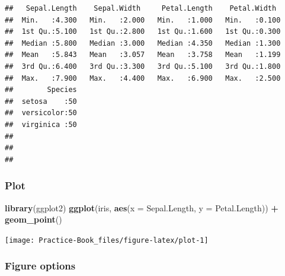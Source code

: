 \documentclass[
]{book}
\newenvironment{Shaded}{\begin{snugshade}}{\end{snugshade}}
\newcommand{\DataTypeTok}[1]{\textcolor[rgb]{0.13,0.29,0.53}{#1}}
\newcommand{\KeywordTok}[1]{\textcolor[rgb]{0.13,0.29,0.53}{\textbf{#1}}}
\newcommand{\NormalTok}[1]{#1}
\newcommand{\OperatorTok}[1]{\textcolor[rgb]{0.81,0.36,0.00}{\textbf{#1}}}
\newcommand{\StringTok}[1]{\textcolor[rgb]{0.31,0.60,0.02}{#1}}
\begin{document}
\begin{verbatim}
##   Sepal.Length    Sepal.Width     Petal.Length    Petal.Width   
##  Min.   :4.300   Min.   :2.000   Min.   :1.000   Min.   :0.100  
##  1st Qu.:5.100   1st Qu.:2.800   1st Qu.:1.600   1st Qu.:0.300  
##  Median :5.800   Median :3.000   Median :4.350   Median :1.300  
##  Mean   :5.843   Mean   :3.057   Mean   :3.758   Mean   :1.199  
##  3rd Qu.:6.400   3rd Qu.:3.300   3rd Qu.:5.100   3rd Qu.:1.800  
##  Max.   :7.900   Max.   :4.400   Max.   :6.900   Max.   :2.500  
##        Species  
##  setosa    :50  
##  versicolor:50  
##  virginica :50  
##                 
##                 
## 
\end{verbatim}

\hypertarget{plot}{%
\subsubsection{Plot}\label{plot}}

\begin{Shaded}
\begin{Highlighting}[]
\KeywordTok{library}\NormalTok{(ggplot2)}
\KeywordTok{ggplot}\NormalTok{(iris, }\KeywordTok{aes}\NormalTok{(}\DataTypeTok{x =}\NormalTok{ Sepal.Length, }\DataTypeTok{y =}\NormalTok{ Petal.Length)) }\OperatorTok{+}\StringTok{ }\KeywordTok{geom\_point}\NormalTok{()}
\end{Highlighting}
\end{Shaded}

\begin{center}\texttt{[image: Practice-Book\_files/figure-latex/plot-1]} \end{center}

\hypertarget{figure-options}{%
\subsubsection{Figure options}\label{figure-options}}
\end{document}

